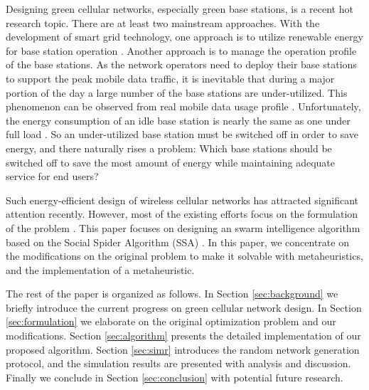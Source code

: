 \documentclass[conference]{IEEEtran}
\begin{document}
Designing green cellular networks, especially green base stations, is a recent hot research topic. There are at least two mainstream approaches. With the development of smart grid technology, one approach is to utilize renewable energy for base station operation \cite{TaoAnsari2013OptimizingGreenEnergy}. Another approach is to manage the operation profile of the base stations. As the network operators need to deploy their base stations to support the peak mobile data traffic, it is inevitable that during a major portion of the day a large number of the base stations are under-utilized. This phenomenon can be observed from real mobile data usage profile \cite{OhSonKrishnamachari2013DynamicBaseStation}. Unfortunately, the energy consumption of an idle base station is nearly the same as one under full load \cite{CorreiaZellerBlumeFerlingJadingGodorAugerPerre2010Challengesandenabling}. So an under-utilized base station must be switched off in order to save energy, and there naturally rises a problem: Which base stations should be switched off to save the most amount of energy while maintaining adequate service for end users?

Such energy-efficient design of wireless cellular networks has attracted significant attention recently. However, most of the existing efforts focus on the formulation of the problem \cite{OhSonKrishnamachari2013DynamicBaseStation}\cite{MarsanChiaraviglioCiulloMeo2009OptimalEnergySavings}. This paper focuses on designing an swarm intelligence algorithm based on the Social Spider Algorithm (SSA) \cite{YuLi2013SocialSpiderAlgorithm}. In this paper, we concentrate on the modifications on the original problem to make it solvable with metaheuristics, and the implementation of a metaheuristic.

The rest of the paper is organized as follows. In Section \ref{sec:background} we briefly introduce the current progress on green cellular network design. In Section \ref{sec:formulation} we elaborate on the original optimization problem and our modifications. Section \ref{sec:algorithm} presents the detailed implementation of our proposed algorithm. Section \ref{sec:simr} introduces the random network generation protocol, and the simulation results are presented with analysis and discussion. Finally we conclude in Section \ref{sec:conclusion} with potential future research.
\end{document}
